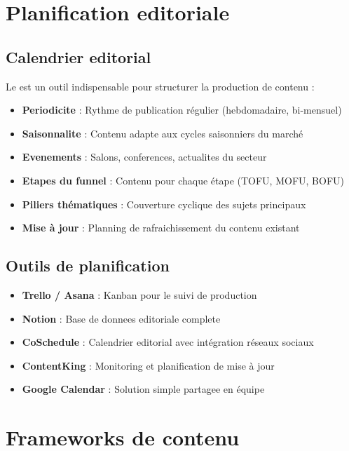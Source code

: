 \section{Planification editoriale}

\subsection{Calendrier editorial}

Le  est un outil indispensable pour structurer la production de contenu :

\begin{itemize}
    \item \textbf{Periodicite} : Rythme de publication régulier (hebdomadaire, bi-mensuel)
    \item \textbf{Saisonnalite} : Contenu adapte aux cycles saisonniers du marché
    \item \textbf{Evenements} : Salons, conferences, actualites du secteur
    \item \textbf{Etapes du funnel} : Contenu pour chaque étape (TOFU, MOFU, BOFU)
    \item \textbf{Piliers thématiques} : Couverture cyclique des sujets principaux
    \item \textbf{Mise à jour} : Planning de rafraichissement du contenu existant
\end{itemize}

\subsection{Outils de planification}

\begin{itemize}
    \item \textbf{Trello / Asana} : Kanban pour le suivi de production
    \item \textbf{Notion} : Base de donnees editoriale complete
    \item \textbf{CoSchedule} : Calendrier editorial avec intégration réseaux sociaux
    \item \textbf{ContentKing} : Monitoring et planification de mise à jour
    \item \textbf{Google Calendar} : Solution simple partagee en équipe
\end{itemize}

\section{Frameworks de contenu}

